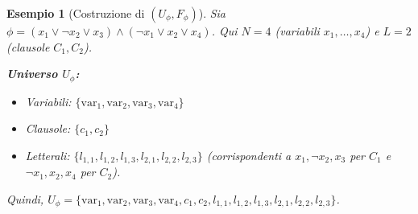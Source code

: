 \documentclass[a4paper, 11pt]{book} %
\newtheorem{example}[theorem]{Esempio}
\theoremstyle{definition}
\begin{document}
\begin{example}[Costruzione di $(U_\phi, F_\phi)$]
Sia $\phi = (x_1 \lor \neg x_2 \lor x_3) \land (\neg x_1 \lor x_2 \lor x_4)$.
Qui $N=4$ (variabili $x_1, \ldots, x_4$) e $L=2$ (clausole $C_1, C_2$).

\textbf{Universo $U_\phi$:}
\begin{itemize}
    \item Variabili: $\{\text{var}_1, \text{var}_2, \text{var}_3, \text{var}_4\}$
    \item Clausole: $\{c_1, c_2\}$
    \item Letterali: $\{l_{1,1}, l_{1,2}, l_{1,3}, l_{2,1}, l_{2,2}, l_{2,3}\}$ (corrispondenti a $x_1, \neg x_2, x_3$ per $C_1$ e $\neg x_1, x_2, x_4$ per $C_2$).
\end{itemize}
Quindi, $U_\phi = \{\text{var}_1, \text{var}_2, \text{var}_3, \text{var}_4, c_1, c_2, l_{1,1}, l_{1,2}, l_{1,3}, l_{2,1}, l_{2,2}, l_{2,3}\}$.


\end{example}
\end{document}
